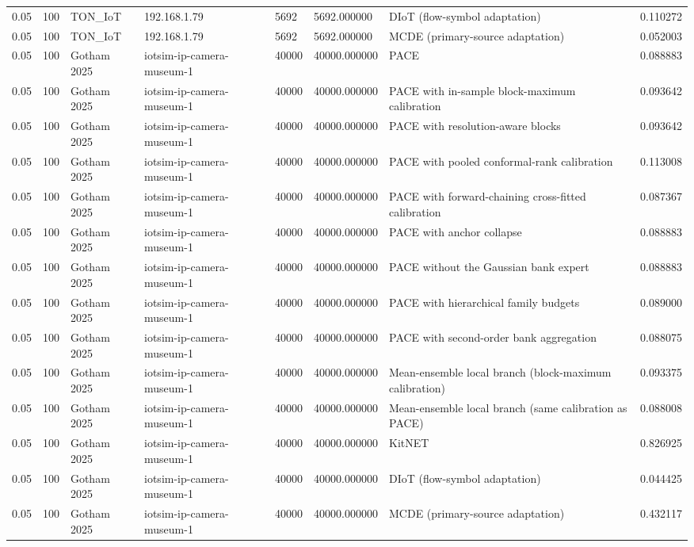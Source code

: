 \begin{tabular}{llllllll}
0.05 & 100 & TON\_IoT & 192.168.1.79 & 5692 & 5692.000000 & DIoT (flow-symbol adaptation) & 0.110272 \\
0.05 & 100 & TON\_IoT & 192.168.1.79 & 5692 & 5692.000000 & MCDE (primary-source adaptation) & 0.052003 \\
0.05 & 100 & Gotham 2025 & iotsim-ip-camera-museum-1 & 40000 & 40000.000000 & PACE & 0.088883 \\
0.05 & 100 & Gotham 2025 & iotsim-ip-camera-museum-1 & 40000 & 40000.000000 & PACE with in-sample block-maximum calibration & 0.093642 \\
0.05 & 100 & Gotham 2025 & iotsim-ip-camera-museum-1 & 40000 & 40000.000000 & PACE with resolution-aware blocks & 0.093642 \\
0.05 & 100 & Gotham 2025 & iotsim-ip-camera-museum-1 & 40000 & 40000.000000 & PACE with pooled conformal-rank calibration & 0.113008 \\
0.05 & 100 & Gotham 2025 & iotsim-ip-camera-museum-1 & 40000 & 40000.000000 & PACE with forward-chaining cross-fitted calibration & 0.087367 \\
0.05 & 100 & Gotham 2025 & iotsim-ip-camera-museum-1 & 40000 & 40000.000000 & PACE with anchor collapse & 0.088883 \\
0.05 & 100 & Gotham 2025 & iotsim-ip-camera-museum-1 & 40000 & 40000.000000 & PACE without the Gaussian bank expert & 0.088883 \\
0.05 & 100 & Gotham 2025 & iotsim-ip-camera-museum-1 & 40000 & 40000.000000 & PACE with hierarchical family budgets & 0.089000 \\
0.05 & 100 & Gotham 2025 & iotsim-ip-camera-museum-1 & 40000 & 40000.000000 & PACE with second-order bank aggregation & 0.088075 \\
0.05 & 100 & Gotham 2025 & iotsim-ip-camera-museum-1 & 40000 & 40000.000000 & Mean-ensemble local branch (block-maximum calibration) & 0.093375 \\
0.05 & 100 & Gotham 2025 & iotsim-ip-camera-museum-1 & 40000 & 40000.000000 & Mean-ensemble local branch (same calibration as PACE) & 0.088008 \\
0.05 & 100 & Gotham 2025 & iotsim-ip-camera-museum-1 & 40000 & 40000.000000 & KitNET & 0.826925 \\
0.05 & 100 & Gotham 2025 & iotsim-ip-camera-museum-1 & 40000 & 40000.000000 & DIoT (flow-symbol adaptation) & 0.044425 \\
0.05 & 100 & Gotham 2025 & iotsim-ip-camera-museum-1 & 40000 & 40000.000000 & MCDE (primary-source adaptation) & 0.432117 \\

\end{tabular}
